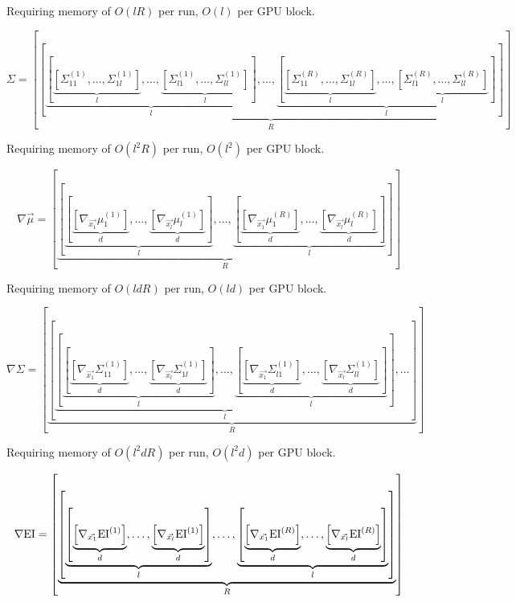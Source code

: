 \documentclass[phd,tocprelim]{cornell}
\begin{document}
Requiring memory of $O(lR)$ per run, $O(l)$ per GPU block.

\begin{equation}
    \Sigma = \left[ \underbrace{ \left[ \underbrace{ \left[ \underbrace{ \left[ \Sigma_{11}^{(1)}, \ldots, \Sigma_{1l}^{(1)} \right]}_{l}, \ldots, \underbrace{ \left[ \Sigma_{l1}^{(1)}, \ldots, \Sigma_{ll}^{(1)} \right]}_{l} \right] }_{l}, \ldots, \underbrace{ \left[ \underbrace{ \left[ \Sigma_{11}^{(R)}, \ldots, \Sigma_{1l}^{(R)} \right]}_{l}, \ldots, \underbrace{ \left[ \Sigma_{l1}^{(R)}, \ldots, \Sigma_{ll}^{(R)} \right]}_{l} \right] }_{l}  \right]}_{R}\right]
\end{equation}

Requiring memory of $O(l^{2}R)$ per run, $O(l^{2})$ per GPU block.

\begin{equation}
    \nabla \vec{\mu} = \left[ \underbrace{ \left[ \underbrace{ \left[ \underbrace{ \left[ \nabla_{\vec{x_{1}}} \mu_{1}^{(1)} \right]}_{d} , \ldots, \underbrace{ \left[ \nabla_{\vec{x_{l}}} \mu_{l}^{(1)} \right]}_{d}\right]}_{l}, \ldots, \underbrace{ \left[ \underbrace{ \left[ \nabla_{\vec{x_{1}}} \mu_{1}^{(R)} \right]}_{d} , \ldots, \underbrace{ \left[ \nabla_{\vec{x_{l}}} \mu_{l}^{(R)} \right]}_{d}\right]}_{l} \right]}_{R} \right]
\end{equation}

Requiring memory of $O(ldR)$ per run, $O(ld)$ per GPU block.

\begin{equation}
    \nabla \Sigma = \left[ \underbrace{ \left[ \underbrace{ \left[ \underbrace{ \left[ \underbrace{ \left[ \nabla_{\vec{x_{1}}} \Sigma_{11}^{(1)} \right]}_{d} , \ldots, \underbrace{ \left[ \nabla_{\vec{x_{l}}} \Sigma_{1l}^{(1)} \right]}_{d}\right]}_{l}, \ldots, \underbrace{ \left[ \underbrace{ \left[ \nabla_{\vec{x_{1}}} \Sigma_{l1}^{(1)} \right]}_{d} , \ldots, \underbrace{ \left[ \nabla_{\vec{x_{l}}} \Sigma_{ll}^{(1)} \right]}_{d}\right]}_{l} \right] }_{l}, \ldots \right]}_{R} \right]
\end{equation}

Requiring memory of $O(l^{2}dR)$ per run, $O(l^{2}d)$ per GPU block.

\begin{equation}
    \nabla {\rm EI} = \left[ \underbrace{ \left[ \underbrace{ \left[ \underbrace{ \left[ \nabla_{\vec{x_{1}}} {\rm EI}^{(1)} \right]}_{d} , \ldots, \underbrace{ \left[ \nabla_{\vec{x_{l}}} {\rm EI}^{(1)} \right]}_{d}\right]}_{l}, \ldots, \underbrace{ \left[ \underbrace{ \left[ \nabla_{\vec{x_{1}}} {\rm EI}^{(R)} \right]}_{d} , \ldots, \underbrace{ \left[ \nabla_{\vec{x_{l}}} {\rm EI}^{(R)} \right]}_{d}\right]}_{l} \right]}_{R} \right]\end{equation}
\end{document}
